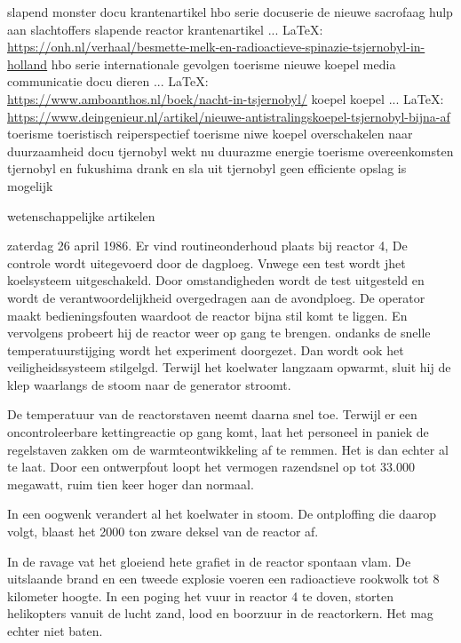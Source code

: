 \begin{thebibliography}{99}
{{{{{{{	slapend monster
	docu
	krantenartikel
	hbo serie
	docuserie
	de  nieuwe sacrofaag
	hulp aan slachtoffers
	slapende reactor
	krantenartikel
	 ... \LaTeX:\\ \url{https://onh.nl/verhaal/besmette-melk-en-radioactieve-spinazie-tsjernobyl-in-holland}
	hbo serie
	internationale gevolgen
	toerisme
	nieuwe koepel
	media communicatie
	docu
	dieren
	 ... \LaTeX:\\ \url{https://www.amboanthos.nl/boek/nacht-in-tsjernobyl/}
	koepel
	koepel
	 ... \LaTeX:\\ \url{https://www.deingenieur.nl/artikel/nieuwe-antistralingskoepel-tsjernobyl-bijna-af}
	toerisme
	toeristisch reiperspectief
	toerisme
	niwe koepel
	overschakelen naar duurzaamheid
	docu
	tjernobyl wekt nu duurazme energie
	toerisme
	overeenkomsten tjernobyl en fukushima
	drank en sla uit tjernobyl
	geen efficiente opslag is mogelijk
	
	wetenschappelijke artikelen
	
	zaterdag 26 april 1986. Er vind routineonderhoud plaats bij reactor 4, De controle wordt uitegevoerd door de dagploeg. Vnwege een test wordt jhet koelsysteem uitgeschakeld. Door omstandigheden wordt de test uitgesteld en wordt de verantwoordelijkheid overgedragen aan de avondploeg.
	De operator maakt bedieningsfouten waardoot de reactor bijna stil komt te liggen. En vervolgens probeert hij de reactor weer op gang te brengen. ondanks de snelle temperatuurstijging wordt het experiment doorgezet. Dan wordt ook het veiligheidssysteem stilgelgd. Terwijl het koelwater langzaam opwarmt, sluit hij de klep waarlangs de stoom naar de generator stroomt.
	
	De temperatuur van de reactorstaven neemt daarna snel toe. Terwijl er een oncontroleerbare kettingreactie op gang komt, laat het personeel in paniek de regelstaven zakken om de warmteontwikkeling af te remmen. Het is dan echter al te laat. Door een ontwerpfout loopt het vermogen razendsnel op tot 33.000 megawatt, ruim tien keer hoger dan normaal.
	
	In een oogwenk verandert al het koelwater in stoom. De ontploffing die daarop volgt, blaast het 2000 ton zware deksel van de reactor af.}

In de ravage vat het gloeiend hete grafiet in de reactor spontaan vlam. De uitslaande brand en een tweede explosie voeren een radioactieve rookwolk tot 8 kilometer hoogte. 
In een poging het vuur in reactor 4 te doven, storten helikopters vanuit de lucht zand, lood en boorzuur in de reactorkern. Het mag echter niet baten.

}}}}}}
\end{thebibliography}
